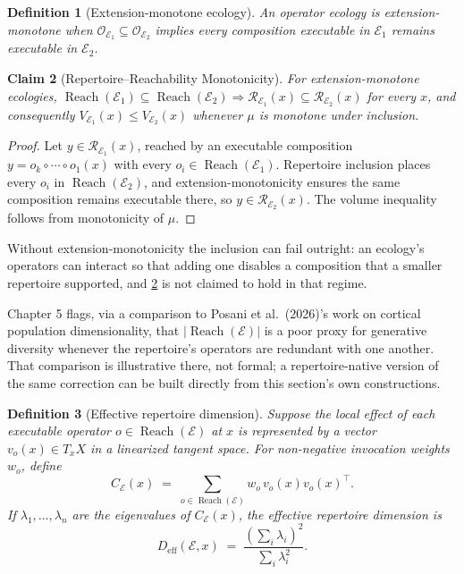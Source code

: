 \documentclass[12pt]{report}
\newtheorem{definition}{Definition}[section]
\newtheorem{claim}[definition]{Claim}
\newcommand{\Reach}{\ensuremath{\operatorname{Reach}}}
\begin{document}
\begin{definition}[Extension-monotone ecology]
\label{def:extension-monotone}
An operator ecology is \emph{extension-monotone} when $\mathcal{O}_{\mathcal{E}_1}
\subseteq \mathcal{O}_{\mathcal{E}_2}$ implies every composition
executable in $\mathcal{E}_1$ remains executable in $\mathcal{E}_2$.
\end{definition}

\begin{claim}[Repertoire--Reachability Monotonicity]
\label{thm:repertoire-reachability}
For extension-monotone ecologies, $\Reach(\mathcal{E}_1) \subseteq
\Reach(\mathcal{E}_2) \Rightarrow \mathcal{R}_{\mathcal{E}_1}(x) \subseteq
\mathcal{R}_{\mathcal{E}_2}(x)$ for every $x$, and consequently
$V_{\mathcal{E}_1}(x) \leq V_{\mathcal{E}_2}(x)$ whenever $\mu$ is
monotone under inclusion.
\end{claim}

\begin{proof}
Let $y \in \mathcal{R}_{\mathcal{E}_1}(x)$, reached by an executable
composition $y = o_k \circ \cdots \circ o_1(x)$ with every $o_i \in
\Reach(\mathcal{E}_1)$. Repertoire inclusion places every $o_i$ in
$\Reach(\mathcal{E}_2)$, and extension-monotonicity ensures the same
composition remains executable there, so $y \in \mathcal{R}_{\mathcal{E}_2}(x)$.
The volume inequality follows from monotonicity of $\mu$.
\end{proof}

Without extension-monotonicity the inclusion can fail outright: an
ecology's operators can interact so that adding one disables a
composition that a smaller repertoire supported, and \cref{thm:repertoire-reachability}
is not claimed to hold in that regime.

Chapter 5 flags, via a comparison to Posani et al.\ (2026)'s work on
cortical population dimensionality, that $|\Reach(\mathcal{E})|$ is a
poor proxy for generative diversity whenever the repertoire's operators
are redundant with one another. That comparison is illustrative there,
not formal; a repertoire-native version of the same correction can be
built directly from this section's own constructions.

\begin{definition}[Effective repertoire dimension]
\label{def:effective-repertoire-dimension}
Suppose the local effect of each executable operator $o \in \Reach(\mathcal{E})$
at $x$ is represented by a vector $v_o(x) \in T_x X$ in a linearized
tangent space. For non-negative invocation weights $w_o$, define
\[
C_\mathcal{E}(x) \;=\; \sum_{o \in \Reach(\mathcal{E})} w_o\, v_o(x) v_o(x)^\top.
\]
If $\lambda_1,\ldots,\lambda_n$ are the eigenvalues of $C_\mathcal{E}(x)$,
the \emph{effective repertoire dimension} is
\[
D_{\mathrm{eff}}(\mathcal{E},x) \;=\; \frac{\left(\sum_i \lambda_i\right)^2}{\sum_i \lambda_i^2}.
\]
\end{definition}
\end{document}
